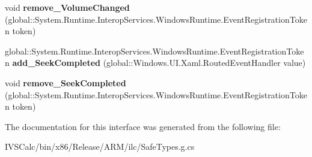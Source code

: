 \begin{DoxyCompactItemize}
void {\bfseries remove\+\_\+\+Volume\+Changed} (global\+::\+System.\+Runtime.\+Interop\+Services.\+Windows\+Runtime.\+Event\+Registration\+Token token)
\item 
\mbox{\label{interface_windows_1_1_u_i_1_1_xaml_1_1_controls_1_1_i_media_element_a64d29cca7343776b34eef183fe2f0a47}} 
global\+::\+System.\+Runtime.\+Interop\+Services.\+Windows\+Runtime.\+Event\+Registration\+Token {\bfseries add\+\_\+\+Seek\+Completed} (global\+::\+Windows.\+U\+I.\+Xaml.\+Routed\+Event\+Handler value)
\item 
\mbox{\label{interface_windows_1_1_u_i_1_1_xaml_1_1_controls_1_1_i_media_element_adb3cb1c1f4bff532d4654363a56adcf1}} 
void {\bfseries remove\+\_\+\+Seek\+Completed} (global\+::\+System.\+Runtime.\+Interop\+Services.\+Windows\+Runtime.\+Event\+Registration\+Token token)
\end{DoxyCompactItemize}


The documentation for this interface was generated from the following file\+:\begin{DoxyCompactItemize}
\item 
I\+V\+S\+Calc/bin/x86/\+Release/\+A\+R\+M/ilc/Safe\+Types.\+g.\+cs\end{DoxyCompactItemize}
